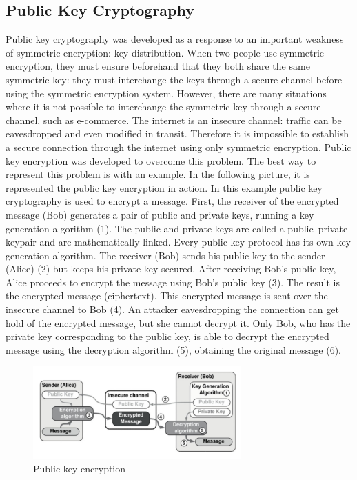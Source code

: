 \documentclass{article}
\begin{document}
\subsection*{Public Key Cryptography}
Public key cryptography was developed as a response to an important weakness of symmetric encryption: key distribution.\newline
When two people use symmetric encryption, they must ensure beforehand that they both share the same symmetric key: they must interchange the keys through a secure channel before using the symmetric encryption system. However, there are many situations where it is not possible to interchange the symmetric key through a secure channel, such as e-commerce. The internet is an insecure channel: traffic can be eavesdropped and even modified in transit. Therefore it is impossible to establish a secure connection through the internet using only symmetric encryption. Public key encryption was developed to overcome this problem. The best way to represent this problem is with an example.\newline
In the following picture, it is represented the public key encryption in action. In this example public key cryptography is used to encrypt a message. First, the receiver of the encrypted message (Bob) generates a pair of public and private keys, running a key generation algorithm (1). The public and private keys are called a public–private keypair and are mathematically linked. Every public key protocol has its own key generation algorithm. The receiver (Bob) sends his public key to the sender (Alice) (2) but keeps his private key secured. After receiving Bob’s public key, Alice proceeds to encrypt the message using Bob’s public key (3). The result is the encrypted message (ciphertext). This encrypted message is sent over the insecure channel to Bob (4). An attacker eavesdropping the connection can get hold of the encrypted message, but she cannot decrypt it. Only Bob, who has the private key corresponding to the public key, is able to decrypt the encrypted message using the decryption algorithm (5), obtaining the original message (6).

\begin{figure}[H]
    \centering
    \includegraphics[width=8cm]{images/8.png}
    \caption{Public key encryption}
\end{figure}
\end{document}
